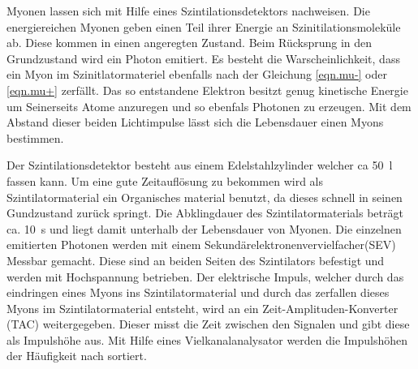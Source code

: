 Myonen lassen sich mit Hilfe eines Szintilationsdetektors nachweisen.
Die energiereichen Myonen geben einen Teil ihrer Energie an Szinitilationsmoleküle ab.
Diese kommen in einen angeregten Zustand.
Beim Rücksprung in den Grundzustand wird ein Photon emitiert.
Es besteht die Warscheinlichkeit, dass ein Myon im Szinitlatormateriel ebenfalls nach der Gleichung \ref{eqn.mu-}
oder \ref{eqn.mu+} zerfällt.
Das so entstandene Elektron besitzt genug kinetische Energie um Seinerseits Atome anzuregen und so ebenfals Photonen zu erzeugen.
Mit dem Abstand dieser beiden Lichtimpulse lässt sich die Lebensdauer einen Myons bestimmen.

Der Szintilationsdetektor besteht aus einem Edelstahlzylinder welcher ca \SI{50}{l} fassen kann.
Um eine gute Zeitauflösung zu bekommen wird als Szintilatormaterial ein Organisches material benutzt,
da dieses schnell in seinen Gundzustand zurück springt.
Die Abklingdauer des Szintilatormaterials beträgt ca. \SI{10}{s} und liegt damit unterhalb der Lebensdauer von Myonen.
Die einzelnen emitierten Photonen werden mit einem Sekundärelektronenvervielfacher(SEV) Messbar gemacht.
Diese sind an beiden Seiten des Szintilators befestigt und werden mit Hochspannung betrieben.
Der elektrische Impuls, welcher durch das eindringen eines Myons ins Szintilatormaterial
und durch das zerfallen dieses Myons im Szintilatormaterial entsteht,
wird an ein Zeit-Amplituden-Konverter (TAC) weitergegeben.
Dieser misst die Zeit zwischen den Signalen und gibt diese als Impulshöhe aus.
Mit Hilfe eines Vielkanalanalysator werden die Impulshöhen der Häufigkeit nach sortiert.

